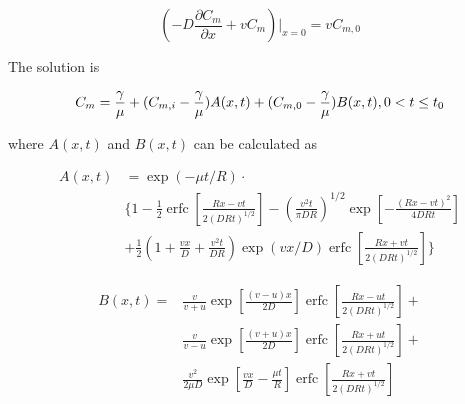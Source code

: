 \documentclass{report}
\newcommand{\erfc}{\operatorname{erfc}}                 %
\begin{document}
\begin{equation}
\left(-D\frac{\partial C_m}{\partial x}+vC_m\right)\bigg\vert_{x=0}=
vC_{m,0}
\end{equation}



The solution is



\begin{equation}
\begin{small}
C_m=\frac{\gamma}{\mu}+
(C_{m,i}-\frac{\gamma}{\mu})A(x,t)+(C_{m,0}-\frac{\gamma}{\mu})B(x,t),
0<t\leq t_0
\end{small}
\end{equation}

where $A(x,t)$ and $B(x,t)$ can be calculated as

\begin{equation}
\begin{split}
A(x,t) & =\exp(-\mu t/R)\cdot \\
& \bigg\{ 1-\frac{1}{2}\erfc\left[\frac{Rx-vt}{2(DRt)^{1/2}}\right]
-\left(\frac{v^2t}{\pi
    DR}\right)^{1/2}\exp\left[-\frac{(Rx-vt)^2}{4DRt}\right] \\ &
+\frac{1}{2}\left(1+\frac{vx}{D}+\frac{v^2t}{DR}\right)\exp(vx/D)\erfc\left[\frac{Rx+vt}{2(DRt)^{1/2}}\right]
\bigg\}
\end{split}
\end{equation}

\begin{equation}
\begin{split}
B(x,t)=&\frac{v}{v+u}\exp\left[\frac{(v-u)x}{2D}\right]\erfc\left[\frac{Rx-ut}{2(DRt)^{1/2}}\right]
+\\
&
\frac{v}{v-u}\exp\left[\frac{(v+u)x}{2D}\right]\erfc\left[\frac{Rx+ut}{2(DRt)^{1/2}}\right]
+\\ &
 \frac{v^2}{2\mu D}\exp\left[\frac{vx}{D}-\frac{\mu
     t}{R}\right]\erfc\left[\frac{Rx+vt}{2(DRt)^{1/2}}\right]
\end{split}
\end{equation}
\end{document}
